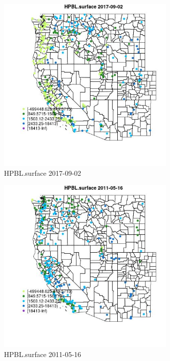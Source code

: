 \begin{figure} 
\centering  
\includegraphics[width=0.77\textwidth]{Code_Outputs/Report_ML_input_PM25_Step4_part_e_de_duplicated_aves_compiled_2019-05-21wNAs_MapObsHPBLsurface2017-09-02.jpg} 
\caption{\label{fig:Report_ML_input_PM25_Step4_part_e_de_duplicated_aves_compiled_2019-05-21wNAsMapObsHPBLsurface2017-09-02}HPBL.surface 2017-09-02} 
\end{figure} 
 

\begin{figure} 
\centering  
\includegraphics[width=0.77\textwidth]{Code_Outputs/Report_ML_input_PM25_Step4_part_e_de_duplicated_aves_compiled_2019-05-21wNAs_MapObsHPBLsurface2011-05-16.jpg} 
\caption{\label{fig:Report_ML_input_PM25_Step4_part_e_de_duplicated_aves_compiled_2019-05-21wNAsMapObsHPBLsurface2011-05-16}HPBL.surface 2011-05-16} 
\end{figure} 
 


